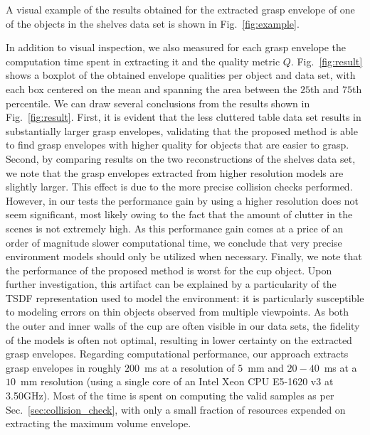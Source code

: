 A visual example of the results obtained for the extracted grasp envelope of one of the objects in the shelves data set is shown in Fig.~\ref{fig:example}.
\par
In addition to visual inspection, we also measured for each grasp envelope the computation time
spent in extracting it and the quality metric $Q$. Fig.~\ref{fig:result} shows a boxplot of the
obtained envelope qualities per object and data set, with each box centered on the mean and spanning
the area between the $25$th and $75$th percentile. We can draw several conclusions from the results
shown in Fig.~\ref{fig:result}. First, it is evident that the less cluttered table data set results
in substantially larger grasp envelopes, validating that the proposed method is able to find grasp
envelopes with higher quality for objects that are easier to grasp.
Second, by comparing results on the two reconstructions of the shelves data set, we note that the grasp envelopes extracted from higher resolution models are slightly larger.
This effect is due to the more precise collision checks performed.
However, in our tests the performance gain by using a higher resolution does not seem significant, most likely owing to the fact that the amount of clutter in the scenes is not extremely high.
As this performance gain comes at a price of an order of magnitude slower computational time, we conclude that very precise environment models should only be utilized when necessary.
Finally, we note that the performance of the proposed method is worst for the cup object. 
Upon further investigation, this artifact can be explained by a particularity of the TSDF representation used to model the environment: it is particularly susceptible to modeling errors on thin objects observed from multiple viewpoints. 
As both the outer and inner walls of the cup are often visible in our data sets, the fidelity of the models is often not optimal, resulting in lower certainty on the extracted grasp envelopes.
Regarding computational performance, our approach extracts grasp envelopes in roughly $200$~ms at a resolution of $5$~mm and  $20-40$~ms at a $10$~mm resolution (using a single core of an Intel Xeon CPU E5-1620 v3 at 3.50GHz).
Most of the time is spent on computing the valid samples as per Sec.~\ref{sec:collision_check}, with only a small fraction of resources expended on extracting the maximum volume envelope.
